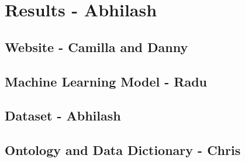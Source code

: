 \section{Results - Abhilash}

\subsection{Website - Camilla and Danny}

\subsection{Machine Learning Model - Radu}

\subsection{Dataset - Abhilash}

\subsection{Ontology and Data Dictionary - Chris}
